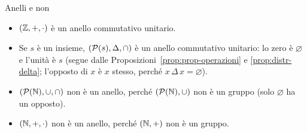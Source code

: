 \begin{esempio}{Anelli e non}
    \begin{itemize}
        \item $(\mathbb{Z}, +, \cdot)$ è un anello commutativo unitario.
        \item Se $s$ è un insieme, $(\mathcal{P}(s), \Delta, \cap)$ è un anello commutativo unitario: lo zero è $\varnothing$ e l'unità è $s$
              (segue dalle Proposizioni~\ref{prop:prop-operazioni} e \ref{prop:distr-delta}; l'opposto di $x$ è $x$ stesso, perché $x \,\Delta\, x = \varnothing$).
        \item $(\mathcal{P}(\mathbb{N}), \cup, \cap)$ non è un anello, perché $(\mathcal{P}(\mathbb{N}), \cup)$ non è un gruppo (solo $\varnothing$ ha un opposto).
        \item $(\mathbb{N}, +, \cdot)$ non è un anello, perché $(\mathbb{N}, +)$ non è un gruppo.
    \end{itemize}
\end{esempio}

